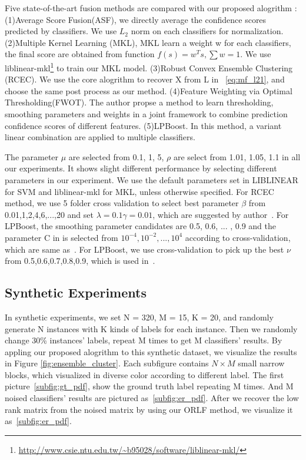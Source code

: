 \documentclass[letterpaper]{article}
\begin{document}
Five state-of-the-art fusion methods are compared with our proposed alogrithm : (1)Average Score Fusion(ASF), we directly average the confidence scores predicted by classifiers. We use $L_2$ norm on each classifiers for normalization. (2)Multiple Kernel Learning (MKL),  MKL learn a weight w for each classifiers, the final score are obtained from function $f(s)=w^{T}s, \sum w = 1$. We use liblinear-mkl\footnote{\url{http://www.csie.ntu.edu.tw/~b95028/software/liblinear-mkl/}} to train our MKL model. (3)Robust Convex Ensemble Clustering (RCEC)\cite{gaoijcai2016robust}. We use the core alogrithm to recover X from L in ~\ref{eq:mf_l21}, and choose the same post process as our method. (4)Feature Weighting via Optimal Thresholding(FWOT)\cite{xuiccv2013feature}. The author propse a method to learn thresholding, smoothing parameters and weights in a joint framework to combine prediction confidence scores of different features. (5)LPBoost\cite{gehler2009feature}. In this method, a variant linear combination are applied to multiple classifiers.

The parameter $\mu$ are selected from {0.1, 1, 5}, $\rho$ are select from {1.01, 1.05, 1.1} in all our experiments. It shows slight different performance by selecting different parameters in our experiment. We use the default parameters set in LIBLINEAR for SVM and liblinear-mkl for MKL, unless otherwise specified. For RCEC method, we use 5 folder cross validation to select best parameter $\beta$ from {0.01,1,2,4,6,...,20} and set $\lambda = 0.1 \gamma = 0.01$, which are suggested by author~\cite{yiicdm2012robust}. For LPBoost, the smoothing parameter candidates are {0.5, 0.6, ... , 0.9} and the parameter C in is selected from $10^{-4},10^{-2},...,10^{4}$ according to cross-validation, which are same as~\cite{xuiccv2013feature}. For LPBoost, we use cross-validation to pick up the best $\nu$ from {0.5,0.6,0.7,0.8,0.9}, which is used in~\cite{xuiccv2013feature}.



\subsection{Synthetic Experiments}


In synthetic experiments, we set N = 320, M = 15, K = 20, and randomly generate N instances with K kinds of labels for each instance. Then we randomly change 30\% instances' labels, repeat M times to get M classifiers' results. By appling our proposed alogrithm to this synthetic dataset, we visualize the results in Figure \ref{fig:ensemble_cluster}. Each subfigure contains $N\times M$ small narrow blocks, which visualized in diverse color according to different label. The first picture~\ref{subfig:gt_pdf}, show the ground truth label repeating M times. And M noised classifiers' results are pictured as~\ref{subfig:er_pdf}. After we recover the low rank matrix from the noised matrix by using our ORLF method, we visualize it as~\ref{subfig:er_pdf}.
\end{document}
